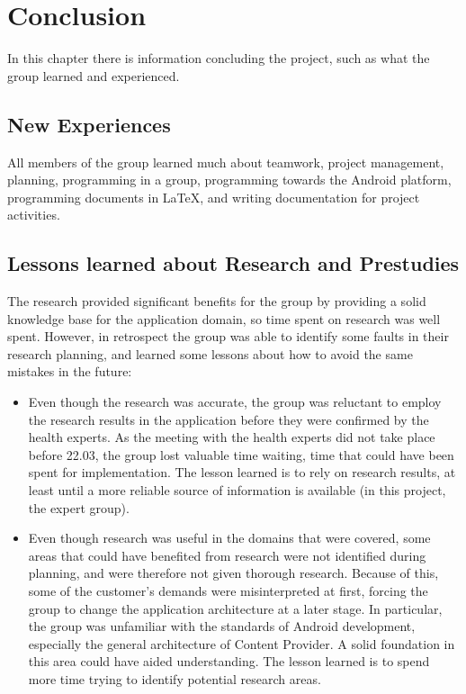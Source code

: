 \chapter{Conclusion}
In this chapter there is information concluding the project, such as what the group learned and experienced.
\section{New Experiences}
All members of the group learned much about teamwork, project management, planning, programming in a group, programming towards the Android platform, programming documents in LaTeX, and writing documentation for project activities. 


\section{Lessons learned about Research and Prestudies}
The research provided significant benefits for the group by providing a solid knowledge base for the application domain, so time spent on research was well spent. However, in retrospect the group was able to identify some faults in their research planning, and learned some lessons about how to avoid the same mistakes in the future:

\begin{itemize}
\item
Even though the research was accurate, the group was reluctant to employ the research results in the application before they were confirmed by the health experts. As the meeting with the health experts did not take place before 22.03, the group lost valuable time waiting, time that could have been spent for implementation. The lesson learned is to rely on research results, at least until a more reliable source of information is available (in this project, the expert group).
\item
Even though research was useful in the domains that were covered, some areas that could have benefited from research were not identified during planning, and were therefore not given thorough research. Because of this, some of the customer's demands were misinterpreted at first, forcing the group to change the application architecture at a later stage. In particular, the group was unfamiliar with the standards of Android development, especially the general architecture of Content Provider. A solid foundation in this area could have aided understanding. The lesson learned is to spend more time trying to identify potential research areas. 
\end{itemize}

